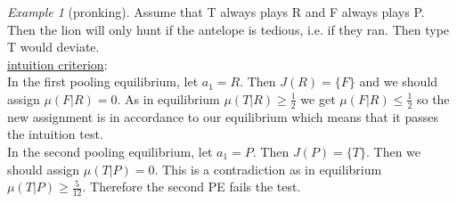\documentclass[a4paper, 12pt]{article}
\theoremstyle{plain}
\theoremstyle{definition}
\theoremstyle{lemma}
\theoremstyle{remark}
\theoremstyle{corollary}
\theoremstyle{example}
\newtheorem{example}[theorem]{Example}
\begin{document}
\begin{example}[pronking]
		Assume that T always plays R and F always plays P. Then the lion will only hunt if the antelope is tedious, i.e. if they ran. Then type T would deviate.\\
		\underline{intuition criterion}:\\
		In the first pooling equilibrium, let $a_1 = R$. Then $J(R) = \{F\}$ and we should assign $\mu(F|R)=0$. As in equilibrium $\mu(T|R) \geq \frac{1}{2}$ we get $\mu(F|R)\leq \frac{1}{2}$ so the new assignment is in accordance to our equilibrium which means that it passes the intuition test.\\
		In the second pooling equilibrium, let $a_1 = P$. Then $J(P) = \{T\}$. Then we should assign $\mu(T|P) = 0$. This is a contradiction as in equilibrium $\mu(T|P) \geq \frac{5}{12}$. Therefore the second PE fails the test.
	\end{example}
\end{document}
